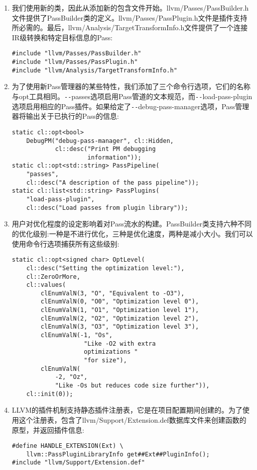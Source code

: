 \begin{enumerate}
\item 我们使用新的类，因此从添加新的包含文件开始。llvm/Passes/PassBuilder.h文件提供了PassBuilder类的定义。llvm/Passes/PassPlugin.h文件是插件支持所必需的。最后，llvm/An\allowbreak alysis/TargetTransformInfo.h文件提供了一个连接IR级转换和特定目标信息的Pass:
\begin{lstlisting}[caption={}]
#include "llvm/Passes/PassBuilder.h"
#include "llvm/Passes/PassPlugin.h"
#include "llvm/Analysis/TargetTransformInfo.h"
\end{lstlisting}

\item 为了使用新Pass管理器的某些特性，我们添加了三个命令行选项，它们的名称与opt工具相同。\verb|--|passes选项启用Pass管道的文本规范，而\verb|--|load-pass-plugin选项启用相应的Pass插件。如果给定了\verb|--|debug-pass-manager选项，Pass管理器将输出关于已执行的Pass的信息:
\begin{lstlisting}[caption={}]
static cl::opt<bool>
	DebugPM("debug-pass-manager", cl::Hidden,
			cl::desc("Print PM debugging 
					 information"));
static cl::opt<std::string> PassPipeline(
	"passes",
	cl::desc("A description of the pass pipeline"));
static cl::list<std::string> PassPlugins(
	"load-pass-plugin",
	cl::desc("Load passes from plugin library"));
\end{lstlisting}

\item 用户对优化程度的设定影响着对Pass流水的构建。PassBuilder类支持六种不同的优化级别:一种是不进行优化，三种是优化速度，两种是减小大小。我们可以使用命令行选项捕获所有这些级别:
\begin{lstlisting}[caption={}]
static cl::opt<signed char> OptLevel(
	cl::desc("Setting the optimization level:"),
	cl::ZeroOrMore,
	cl::values(
		clEnumValN(3, "O", "Equivalent to -O3"),
		clEnumValN(0, "O0", "Optimization level 0"),
		clEnumValN(1, "O1", "Optimization level 1"),
		clEnumValN(2, "O2", "Optimization level 2"),
		clEnumValN(3, "O3", "Optimization level 3"),
		clEnumValN(-1, "Os",
					"Like -O2 with extra 
					optimizations "
					"for size"),
		clEnumValN(
			-2, "Oz",
			"Like -Os but reduces code size further")),
	cl::init(0));
\end{lstlisting}

\item LLVM的插件机制支持静态插件注册表，它是在项目配置期间创建的。为了使用这个注册表，包含了llvm/Support/Extension.def数据库文件来创建函数的原型，并返回插件信息:
\begin{lstlisting}[caption={}]
#define HANDLE_EXTENSION(Ext) \
	llvm::PassPluginLibraryInfo get##Ext##PluginInfo();
#include "llvm/Support/Extension.def"
\end{lstlisting}


\end{enumerate}
